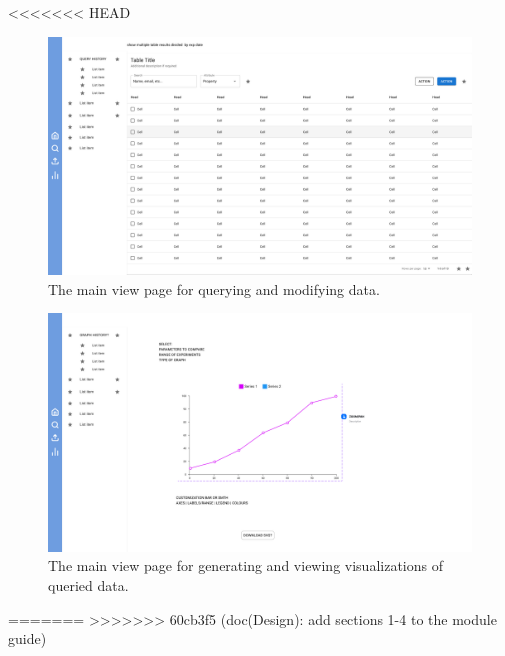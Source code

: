 \documentclass[12pt, titlepage]{article}
\begin{document}
\begin{description}
\begin{description}
<<<<<<< HEAD
\begin{figure}[htbp]
  \centering
  \includegraphics[width=\textwidth]{Figma/table.pdf}
  \caption{The main view page for querying and modifying data.}
  \label{fig:FigUITB}
\end{figure}

\begin{figure}[htbp]
  \centering
  \includegraphics[width=\textwidth]{Figma/graphs.pdf}
  \caption{The main view page for generating and viewing visualizations of queried data.}
  \label{fig:FigUIG}
\end{figure}

=======
>>>>>>> 60cb3f5 (doc(Design): add sections 1-4 to the module guide)

\end{description}
\end{description}
\end{document}
